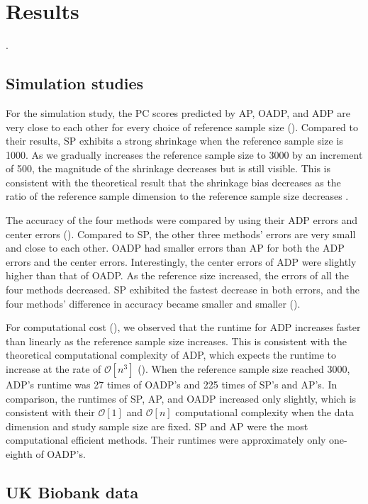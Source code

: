 \documentclass{article}
\newcommand{\bO}{\mathcal{O}}
\begin{document}
\section{Results}\label{sec:results}.

\subsection{Simulation studies}

For the simulation study,
the PC scores predicted by AP, OADP, and ADP
are very close to each other
for every choice of reference sample size ().
Compared to their results,
SP exhibits a strong shrinkage
when the reference sample size is 1000.
As we gradually increases the reference sample size to 3000
by an increment of 500,
the magnitude of the shrinkage decreases
but is still visible.
This is consistent with the theoretical result
that the shrinkage bias decreases
as the ratio of
the reference sample dimension to the reference sample size
decreases \citep{dey2016asymptotic}.

The accuracy of the four methods were compared
by using their ADP errors and center errors ().
Compared to SP,
the other three methods' errors are very small
and close to each other.
OADP had smaller errors than AP
for both the ADP errors and the center errors.
Interestingly, the center errors of ADP were slightly higher
than that of OADP.
As the reference size increased,
the errors of all the four methods decreased.
SP exhibited the fastest decrease in both errors,
and the four methods' difference in accuracy
became smaller and smaller ().

For computational cost (),
we observed that the runtime for ADP increases faster than linearly
as the reference sample size increases.
This is consistent
with the theoretical computational complexity of ADP,
which expects the runtime to increase at the rate of $\bO[n^3]$ ().
When the reference sample size reached 3000,
ADP's runtime was 27 times of OADP's
and 225 times of SP's and AP's.
In comparison, the runtimes of SP, AP, and OADP
increased only slightly,
which is consistent with their $\bO[1]$ and $\bO[n]$ computational complexity when the data dimension and study sample size are fixed.
SP and AP were the most computational efficient methods.
Their runtimes were approximately only one-eighth of OADP's.

\subsection{UK Biobank data}
\end{document}
